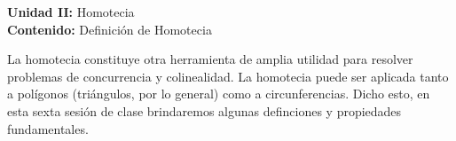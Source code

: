 {\Large
    \textbf{Unidad II:} Homotecia\vspace{2mm}\\
    \textbf{Contenido:} Definición de Homotecia
}

La homotecia constituye otra herramienta de amplia utilidad para resolver problemas de concurrencia y colinealidad.
La homotecia puede ser aplicada tanto a polígonos (triángulos, por lo general) como a circunferencias.
Dicho esto, en esta sexta sesión de clase brindaremos algunas definciones y propiedades fundamentales.